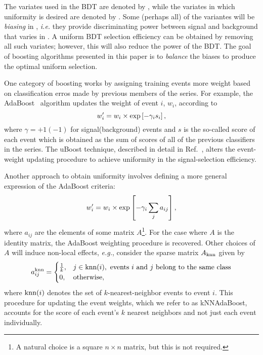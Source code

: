 The variates used in the BDT are denoted by \x, while the variates in which uniformity is desired are denoted by \y.  Some (perhaps all) of the \x variantes will be {\em biasing} in \y, {\em i.e.} they provide discriminating power between signal and background that varies in \y.  A uniform BDT selection efficiency can be obtained by removing all such variates; however, this will also reduce the power of the BDT.  The goal of boosting algorithms presented in this paper is to {\em balance} the biases to produce the optimal uniform selection.

One category of boosting works by assigning training events more weight based on classification erros made by previous members of the series.  For example, the AdaBoost~\cite{ref:adaboost} algorithm updates the weight of event $i$, $w_i$, according to
\begin{equation}
w_i^{\prime} = w_i \times {\rm exp}\left[-\gamma_i s_i\right], 
\end{equation}
where $\gamma = +1(-1)$ for signal(background) events and $s$ is the so-called score of each event which is obtained as the sum of scores of all of the previous classifiers in the series.  
The uBoost technique, described in detail in Ref.~\cite{cit:uboost}, alters the event-weight updating procedure to achieve uniformity in the signal-selection efficiency. 


Another approach to obtain uniformity involves defining a more general expression of the AdaBoost criteria:
\begin{equation}
 w_i^{\prime} = w_i \times {\rm exp}\left[-\gamma_i \sum_j a_{ij}\right],
\end{equation}
where $a_{ij}$ are the elements of some matrix $A$\footnote{A natural choice is a square $n\times n$ matrix, but this is not required.}.  For the case where $A$ is the identity matrix, the AdaBoost weighting procedure is recovered.  
Other choices of $A$ will induce non-local effects, {\em e.g.}, consider the sparse matrix $A_{\rm knn}$ given by
\begin{equation}
  a_{ij}^{\rm knn} = \begin{cases} 
    \frac{1}{k}, & j \in \text{knn}(i), \text{ events $i$ and $j$ belong to the same class} \\
    0, & \text{otherwise},
\end{cases}
\end{equation}
where $\text{knn}(i)$ denotes the set of $k$-nearest-neighbor events to event $i$.
This procedure for updating the event weights, which we refer to as kNNAdaBoost, accounts for the score of each event's $k$ nearest neighbors and not just each event individually.


